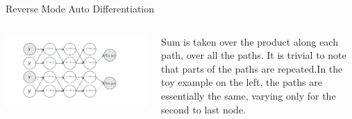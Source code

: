 \begin{frame}{Reverse Mode Auto Differentiation}
\begin{columns}[T]
\begin{column}{0.7\textwidth}
\begin{center}
	\includegraphics[width=\textwidth]{images/path comp.png}
\end{center}
\end{column}
\begin{column}{0.3\textwidth}
Sum is taken over the product along each path, over all the paths. It is trivial to note that parts of the paths are repeated.\pause In the toy example on the left, the paths are essentially the same, varying only for the second to last node.
\end{column}
\end{columns}
\end{frame}

